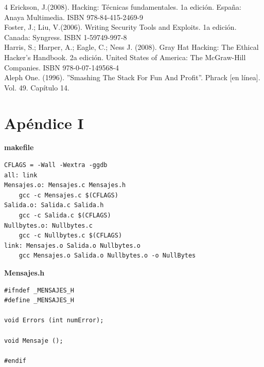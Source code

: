\documentclass [titlepage, 12pt]{article}
\renewcommand{\appendixname}{Ap\'endices}	%
\begin{document}
\pagebreak

\begin {thebibliography}{4}
\bigskip
{} Erickson, J.(2008). Hacking: T\'ecnicas fundamentales. 1a edici\'on. Espa\~na: Anaya Multimedia. ISBN 978-84-415-2469-9 \\
 Foster, J.; Liu, V.(2006). Writing Security Tools and Exploits. 1a edici\'on. Canada: Syngress. ISBN 1-59749-997-8 \\
 Harris, S.; Harper, A.; Eagle, C.; Ness J. (2008). Gray Hat Hacking: The Ethical Hacker's Handbook. 2a edici\'on. United States of America: The McGraw-Hill Companies. ISBN 978-0-07-149568-4 \\
 Aleph One. (1996). ''Smashing The Stack For Fun And Profit''. Phrack [en l\'inea]. Vol. 49. Cap\'itulo 14.
\end{thebibliography}

\pagebreak

\appendix
\section{Ap\'endice I}
\textbf{makefile}
\lstset{language=C++,caption=makefile}
\begin{lstlisting}
CFLAGS = -Wall -Wextra -ggdb
all: link
Mensajes.o: Mensajes.c Mensajes.h
	gcc -c Mensajes.c $(CFLAGS)
Salida.o: Salida.c Salida.h
	gcc -c Salida.c $(CFLAGS)
Nullbytes.o: Nullbytes.c
	gcc -c Nullbytes.c $(CFLAGS)
link: Mensajes.o Salida.o Nullbytes.o
	gcc Mensajes.o Salida.o Nullbytes.o -o NullBytes
\end{lstlisting}\bigskip

\textbf{Mensajes.h}
\lstset{language=C++,caption=Mensajes.h}
\begin{lstlisting}
#ifndef _MENSAJES_H
#define _MENSAJES_H

void Errors (int numError);

void Mensaje ();

#endif
\end{lstlisting}\bigskip
\end{document}
